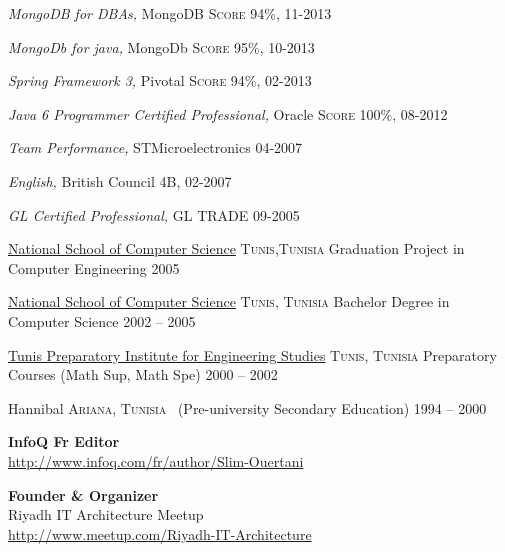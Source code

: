 \documentclass[10pt,a4paper]{article}
\begin{document}
\headedsection
  {{\sl \textit {MongoDB for DBAs},} MongoDB}
  {\textsc{Score 94\%, 11-2013}} 
  
\headedsection
  {{\sl \textit {MongoDb for java},} MongoDb}
  {\textsc{Score 95\%, 10-2013}} 
  
\headedsection
  {{\sl \textit {Spring Framework 3},} Pivotal}
  {\textsc{Score 94\%, 02-2013}} 
  
\headedsection
  {{\sl \textit {Java 6 Programmer Certified Professional},} Oracle}
  {\textsc{Score 100\%, 08-2012}} 
  
\headedsection
  {{\sl \textit {Team Performance},} STMicroelectronics}
  {\textsc{04-2007}} 

\headedsection
  {{\sl \textit {English},} British Council}
  {\textsc{4B, 02-2007}} 
  
\headedsection
  {{\sl \textit {GL Certified Professional},} GL TRADE}
  {\textsc{09-2005}} 

\spacedhrule{0em}{-0.4em}



\headedsection
  {\href{http://www.ensi.rnu.tn/}{ National School of Computer Science}}
  {\textsc{Tunis,Tunisia}} {%
  \headedsubsection
    {Graduation Project in Computer Engineering}
    {2005}{}
}

\headedsection
 {\href{http://www.ensi.rnu.tn/}{ National School of Computer Science}}
  {\textsc{Tunis, Tunisia}} {%
  \headedsubsection
    {Bachelor Degree in Computer Science}
    {2002 -- 2005} {}
}



\headedsection
  {\href{http://www.ipeit.rnu.tn/en}{Tunis Preparatory Institute for Engineering Studies}}
  {\textsc{Tunis, Tunisia}} {%
  \headedsubsection
    {Preparatory Courses (Math Sup, Math Spe)}
    {2000 -- 2002} {}
}

\headedsection
  {{Hannibal}}
  {\textsc{Ariana, Tunisia}} {%
  \headedsubsection
    { \textnormal{~(Pre-university Secondary Education)}}
    {1994 -- 2000} {}
}

\spacedhrule{0em}{-0.4em}

\begin{multicols}{2}

{\bf  InfoQ Fr Editor} \\
\url{http://www.infoq.com/fr/author/Slim-Ouertani} 

\columnbreak


{\bf Founder \& Organizer} \\
Riyadh IT Architecture Meetup\\
\url{http://www.meetup.com/Riyadh-IT-Architecture}\\
 


\end{multicols}
\end{document}
